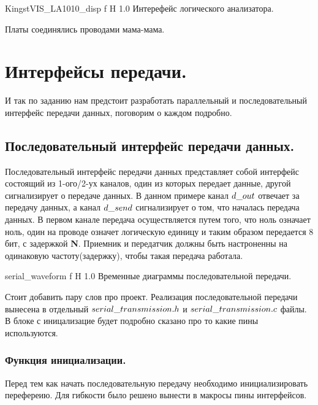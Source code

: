 \documentclass{bmstu}
\begin{document}
	{KingstVIS_LA1010_disp} %
	{f} %
	{H} %
	{1.0\textwidth} %
	{Интерефейс логического анализатора.}

	Платы соединялись проводами мама-мама.
	\chapter{Интерфейсы передачи.}
	
	И так по заданию нам предстоит разработать параллельный и последовательный интерфейс передачи данных, поговорим о каждом подробно.
	
	\section{Последовательный интерфейс передачи данных.}
	
	Последовательный интерфейс передачи данных представляет собой интерфейс состоящий из 1-ого/2-ух каналов,
	один из которых передает данные, другой сигнализирует о передаче данных. В данном примере канал $d\text{\textunderscore}out$ отвечает за передачу данных,
	а канал $d\text{\textunderscore}send$ сигнализирует о том, что началась передача данных. В первом канале передача осуществляется путем того, что ноль означает ноль, один на проводе означет
	логическую единицу и таким образом передается 8 бит, с задержкой \textbf{N}. Приемник и передатчик должны быть настроненны на одинаковую частоту(задержку),
	чтобы такая передача работала.
	
	{serial_waveform} %
	{f} %
	{H} %
	{1.0\textwidth} %
	{Временные диаграммы последовательной передачи.}
	
	Стоит добавить пару слов про проект. Реализация последовательной передачи вынесена в отдельный $serial\text{\textunderscore}transmission.h$ и $serial\text{\textunderscore}transmission.c$ файлы.
	В блоке с иницализацие будет подробно сказано про то какие пины используются.
	
	\subsection{Функция инициализации.}
	
	Перед тем как начать последовательную передачу необходимо инициализировать перефереию. Для гибкости было решено вынести в макросы пины интерфейсов.
	
\end{document}
